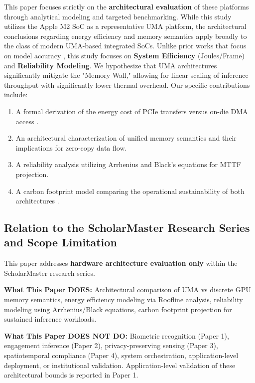 \documentclass[conference]{IEEEtran}
\begin{document}
This paper focuses strictly on the \textbf{architectural evaluation} of these platforms through analytical modeling and targeted benchmarking. While this study utilizes the Apple M2 SoC as a representative UMA platform, the architectural conclusions regarding energy efficiency and memory semantics apply broadly to the class of modern UMA-based integrated SoCs. Unlike prior works that focus on model accuracy \cite{b11}, this study focuses on \textbf{System Efficiency} (Joules/Frame) and \textbf{Reliability Modeling}. We hypothesize that UMA architectures significantly mitigate the "Memory Wall," allowing for linear scaling of inference throughput with significantly lower thermal overhead. Our specific contributions include:
\begin{enumerate}
    \item A formal derivation of the energy cost of PCIe transfers versus on-die DMA access \cite{b8, b1}.
    \item An architectural characterization of unified memory semantics and their implications for zero-copy data flow.
    \item A reliability analysis utilizing Arrhenius and Black's equations for MTTF projection.
    \item A carbon footprint model comparing the operational sustainability of both architectures \cite{b12}.
\end{enumerate}

\subsection{Relation to the ScholarMaster Research Series and Scope Limitation}

This paper addresses \textbf{hardware architecture evaluation only} within the ScholarMaster research series. 

\textbf{What This Paper DOES:}
Architectural comparison of UMA vs discrete GPU memory semantics, energy efficiency modeling via Roofline analysis, reliability modeling using Arrhenius/Black equations, carbon footprint projection for sustained inference workloads.

\textbf{What This Paper DOES NOT DO:}
Biometric recognition (Paper 1), engagement inference (Paper 2), privacy-preserving sensing (Paper 3), spatiotemporal compliance (Paper 4), system orchestration, application-level deployment, or institutional validation. Application-level validation of these architectural bounds is reported in Paper 1.
\end{document}
